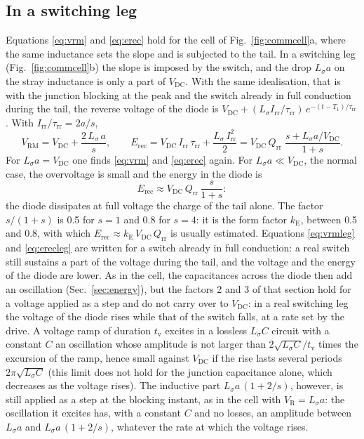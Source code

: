 \documentclass[10pt,a4paper]{scrartcl}
\newcommand{\VR}{V_\mathrm{R}}
\newcommand{\Irr}{I_\mathrm{rr}}
\newcommand{\Qrr}{Q_\mathrm{rr}}
\newcommand{\taurr}{\tau_\mathrm{rr}}
\newcommand{\Tone}{T_1}
\newcommand{\Vrm}{V_\mathrm{RM}}
\newcommand{\Ls}{L_\sigma}                    %
\newcommand{\Vdc}{V_\mathrm{DC}}
\newcommand{\Erec}{E_\mathrm{rec}}
\begin{document}
\subsection{In a switching leg}
\label{sec:switchingleg}
Equations \eqref{eq:vrm} and \eqref{eq:erec} hold for the cell of Fig.~\ref{fig:commcell}a, where the same inductance sets the slope and is subjected to the tail. In a switching leg (Fig.~\ref{fig:commcell}b) the slope is imposed by the switch, and the drop $\Ls a$ on the stray inductance is only a part of $\Vdc$. With the same idealisation, that is with the junction blocking at the peak and the switch already in full conduction during the tail, the reverse voltage of the diode is $\Vdc + (\Ls\Irr/\taurr)\,e^{-(t-\Tone)/\taurr}$. With $\Irr/\taurr = 2a/s$,
\begin{equation}
\Vrm = \Vdc + \frac{2\,\Ls\,a}{s} , \qquad
\Erec = \Vdc\,\Irr\,\taurr + \frac{\Ls\,\Irr^2}{2} = \Vdc\,\Qrr\;\frac{s + \Ls a/\Vdc}{1+s} .
\label{eq:vrmleg}
\end{equation}
For $\Ls a = \Vdc$ one finds \eqref{eq:vrm} and \eqref{eq:erec} again. For $\Ls a \ll \Vdc$, the normal case, the overvoltage is small and the energy in the diode is
\begin{equation}
\Erec \approx \Vdc\,\Qrr\,\frac{s}{1+s} :
\label{eq:erecleg}
\end{equation}
the diode dissipates at full voltage the charge of the tail alone. The factor $s/(1+s)$ is \num{0.5} for $s = 1$ and \num{0.8} for $s = 4$: it is the form factor $k_\mathrm{E}$, between \num{0.5} and \num{0.8}, with which $\Erec \approx k_\mathrm{E}\,\Vdc\,\Qrr$ is usually estimated. Equations \eqref{eq:vrmleg} and \eqref{eq:erecleg} are written for a switch already in full conduction: a real switch still sustains a part of the voltage during the tail, and the voltage and the energy of the diode are lower. As in the cell, the capacitances across the diode then add an oscillation (Sec.~\ref{sec:energy}), but the factors 2 and 3 of that section hold for a voltage applied as a step and do not carry over to $\Vdc$: in a real switching leg the voltage of the diode rises while that of the switch falls, at a rate set by the drive. A voltage ramp of duration $t_\mathrm{v}$ excites in a lossless $\Ls C$ circuit with a constant $C$ an oscillation whose amplitude is not larger than $2\sqrt{\Ls C}/t_\mathrm{v}$ times the excursion of the ramp, hence small against $\Vdc$ if the rise lasts several periods $2\pi\sqrt{\Ls C}$ (this limit does not hold for the junction capacitance alone, which decreases as the voltage rises). The inductive part $\Ls a\,(1+2/s)$, however, is still applied as a step at the blocking instant, as in the cell with $\VR = \Ls a$: the oscillation it excites has, with a constant $C$ and no losses, an amplitude between $\Ls a$ and $\Ls a\,(1+2/s)$, whatever the rate at which the voltage rises.
\end{document}
